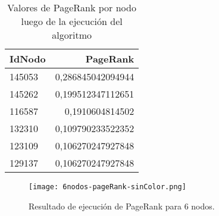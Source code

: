 \begin{table}
\centering
\label{tab:TablaPageRank6Nodos}
\begin{tabular}{|l|r|}
	\hline
	\textbf{IdNodo} &  \textbf{PageRank} \\
	\hline
	145053 &  0,286845042094944 \\
	\hline
	145262 &  0,199512347112651 \\
	\hline
	116587 &  0,1910604814502 \\
	\hline
	132310 &  0,109790233522352 \\
	\hline
	123109 &  0,106270247927848 \\
	\hline
	129137 &  0,106270247927848 \\
	\hline
\end{tabular}
\vspace{10pt}
\caption{Valores de PageRank por nodo luego de la ejecución del algoritmo}
\end{table}

\begin{figure}
	\centering
	\texttt{[image: 6nodos-pageRank-sinColor.png]}
	\caption{Resultado de ejecución de PageRank para 6 nodos.} 
	\label{fig:6nodos-pageRank-sinColor}
\end{figure}



